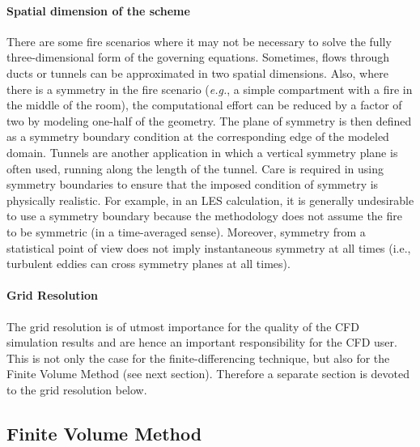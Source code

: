 \documentclass[graybox]{svmult}
\begin{document}
\paragraph{Spatial dimension of the scheme}

There are some fire scenarios where it may not be necessary to solve the fully three-dimensional form of the governing equations. Sometimes, flows through ducts or tunnels can be approximated in two spatial dimensions. Also, where there is a symmetry in the fire scenario ({\em e.g.}, a simple compartment with a fire in the middle of the room), the computational effort can be reduced by a factor of two by modeling one-half of the geometry. The plane of symmetry is then defined as a symmetry boundary condition at the corresponding edge of the modeled domain. Tunnels are another application in which a vertical symmetry plane is often used, running along the length of the tunnel. Care is required in using symmetry boundaries to ensure that the imposed condition of symmetry is physically realistic. For example, in an LES calculation, it is generally undesirable to use a symmetry boundary because the methodology does not assume the fire to be symmetric (in a time-averaged sense). Moreover, symmetry from a statistical point of view does not imply instantaneous symmetry at all times (i.e., turbulent eddies can cross symmetry planes at all times).

\paragraph{Grid Resolution}

The grid resolution is of utmost importance for the quality of the CFD simulation results and are hence an important responsibility for the CFD user. This is not only the case for the finite-differencing technique, but also for the Finite Volume Method (see next section). Therefore a separate section is devoted to the grid resolution below. 

\subsection{Finite Volume Method}
\end{document}
